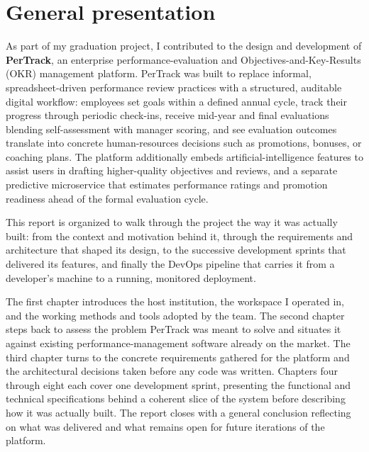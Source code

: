 \documentclass[12pt,a4paper]{report}
\begin{document}
\chapter*{General presentation}

As part of my graduation project, I contributed to the design and development of \textbf{PerTrack}, an enterprise performance-evaluation and Objectives-and-Key-Results (OKR) management platform. PerTrack was built to replace informal, spreadsheet-driven performance review practices with a structured, auditable digital workflow: employees set goals within a defined annual cycle, track their progress through periodic check-ins, receive mid-year and final evaluations blending self-assessment with manager scoring, and see evaluation outcomes translate into concrete human-resources decisions such as promotions, bonuses, or coaching plans. The platform additionally embeds artificial-intelligence features to assist users in drafting higher-quality objectives and reviews, and a separate predictive microservice that estimates performance ratings and promotion readiness ahead of the formal evaluation cycle.

This report is organized to walk through the project the way it was actually built: from the context and motivation behind it, through the requirements and architecture that shaped its design, to the successive development sprints that delivered its features, and finally the DevOps pipeline that carries it from a developer's machine to a running, monitored deployment.

The first chapter introduces the host institution, the workspace I operated in, and the working methods and tools adopted by the team. The second chapter steps back to assess the problem PerTrack was meant to solve and situates it against existing performance-management software already on the market. The third chapter turns to the concrete requirements gathered for the platform and the architectural decisions taken before any code was written. Chapters four through eight each cover one development sprint, presenting the functional and technical specifications behind a coherent slice of the system before describing how it was actually built. The report closes with a general conclusion reflecting on what was delivered and what remains open for future iterations of the platform.

\clearpage

\end{document}
